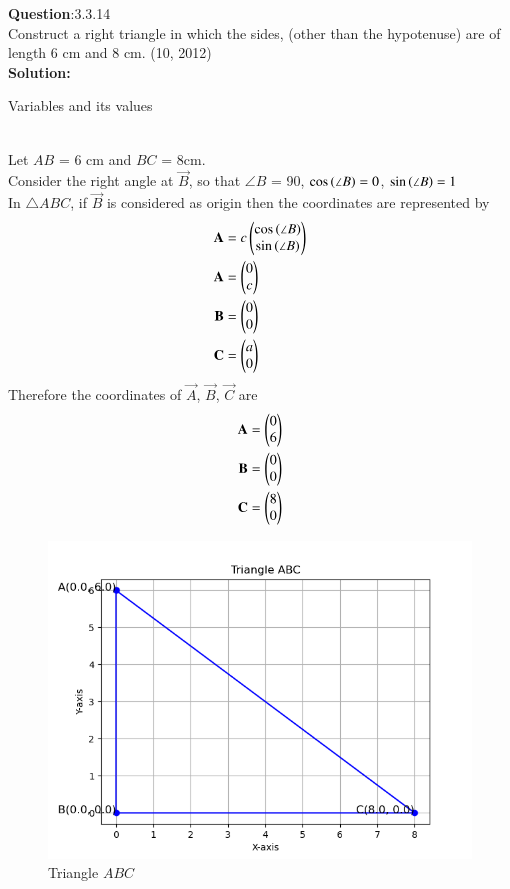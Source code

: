 \documentclass[journal]{IEEEtran}
\begin{document}
\textbf{Question}:3.3.14\\
Construct a right triangle in which the sides, (other than the hypotenuse) are of length 6 cm and 8 cm. \hfill(10, 2012)
\\
\textbf{Solution:}
\renewcommand{\tablename}{Table 3.3.14.1}
\begin{table}[h!]
  \centering
  
  \caption{Variables and its values}
\end{table}
\\
Let $AB$ = 6 cm and $BC$ = 8cm.\\
Consider the right angle at $\vec{B}$, so that $\angle B$ = 90\degree, $\cos{\ensuremath{\left(\angle B\right)}} = 0$, $\sin{\ensuremath{\left(\angle B\right)}} = 1$\\
In $\triangle ABC$, if $\vec{B}$ is considered as origin then the coordinates are represented by
 \begin{align}
 \mathbf{A} & = c\begin{pmatrix}\cos{\ensuremath{\left(\angle B\right)}} \\ \sin{\ensuremath{\left(\angle B\right)}}\end{pmatrix} \\
 \mathbf{A} & = \begin{pmatrix}0 \\ c\end{pmatrix} \\
 \mathbf{B} & = \begin{pmatrix}0 \\ 0\end{pmatrix} \\
 \mathbf{C} & = \begin{pmatrix}a \\ 0\end{pmatrix}
 \end{align}
Therefore the coordinates of $\vec{A}$, $\vec{B}$, $\vec{C}$ are
\begin{align}
\mathbf{A} & = \begin{pmatrix}0 \\ 6\end{pmatrix} \\
\mathbf{B} & = \begin{pmatrix}0 \\ 0\end{pmatrix} \\
\mathbf{C} & = \begin{pmatrix}8 \\ 0\end{pmatrix}
\end{align}
\begin{figure}[h!]
   \centering
   \includegraphics[width=0.7\linewidth]{figs/triangle.png}
	\caption{Triangle $ABC$}
   \end{figure}
\end{document}
